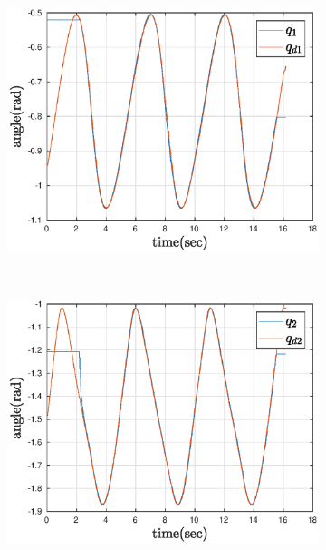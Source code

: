 \def\picsSiz{1.08}
\begin{figure}[htbp]
    \centering
    \begin{subfigure}[htbp]{0.45\textwidth}
        \centering
        \includegraphics[width = \picsSiz\linewidth]{img/pathF1ff.eps}
        \caption{ }
    \end{subfigure}
    ~ 
    \begin{subfigure}[htbp]{0.45\textwidth}
        \centering
        \includegraphics[width = \picsSiz\linewidth]{img/pathF2ff.eps}
        \caption{ }
    \end{subfigure}
    ~
    \centering
    \begin{subfigure}[htbp]{0.45\textwidth}

\end{subfigure}
\end{figure}
